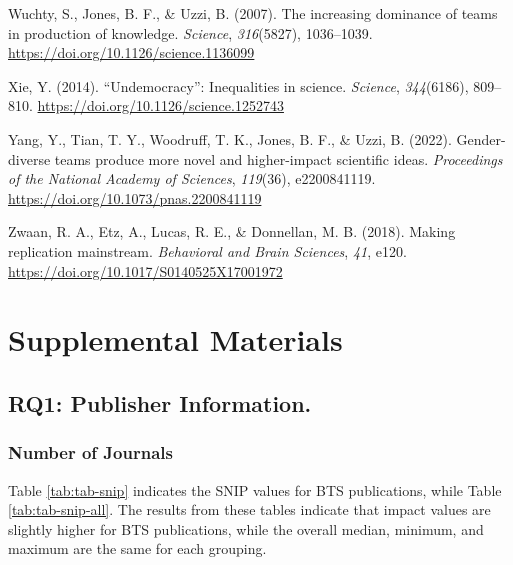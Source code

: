 \documentclass[
  man,mask,floatsintext]{apa7}
\newlength{\cslhangindent}
\newlength{\cslentryspacingunit} %
\newenvironment{CSLReferences}[2] %
 {%
  \setlength{\parindent}{0pt}
  \ifodd #1
  \let\oldpar\par
  \def\par{\hangindent=\cslhangindent\oldpar}
  \fi
  \setlength{\parskip}{#2\cslentryspacingunit}
 }%
 {}
\begin{document}
\begin{CSLReferences}{1}{0}
\leavevmode{}%
Wuchty, S., Jones, B. F., \& Uzzi, B. (2007). The increasing dominance of teams in production of knowledge. \emph{Science}, \emph{316}(5827), 1036--1039. \url{https://doi.org/10.1126/science.1136099}

\leavevmode{}%
Xie, Y. (2014). {``}Undemocracy{''}: Inequalities in science. \emph{Science}, \emph{344}(6186), 809--810. \url{https://doi.org/10.1126/science.1252743}

\leavevmode{}%
Yang, Y., Tian, T. Y., Woodruff, T. K., Jones, B. F., \& Uzzi, B. (2022). Gender-diverse teams produce more novel and higher-impact scientific ideas. \emph{Proceedings of the National Academy of Sciences}, \emph{119}(36), e2200841119. \url{https://doi.org/10.1073/pnas.2200841119}

\leavevmode{}%
Zwaan, R. A., Etz, A., Lucas, R. E., \& Donnellan, M. B. (2018). Making replication mainstream. \emph{Behavioral and Brain Sciences}, \emph{41}, e120. \url{https://doi.org/10.1017/S0140525X17001972}

\end{CSLReferences}

\endgroup

\newpage

\hypertarget{appendix-appendix}{%
\appendix}


\hypertarget{supplemental-materials}{%
\section{Supplemental Materials}\label{supplemental-materials}}

\hypertarget{rq1-publisher-information.-1}{%
\subsection{RQ1: Publisher Information.}\label{rq1-publisher-information.-1}}

\hypertarget{number-of-journals-1}{%
\subsubsection{Number of Journals}\label{number-of-journals-1}}

Table \ref{tab:tab-snip} indicates the SNIP values for BTS publications, while Table \ref{tab:tab-snip-all}. The results from these tables indicate that impact values are slightly higher for BTS publications, while the overall median, minimum, and maximum are the same for each grouping.
\end{document}
